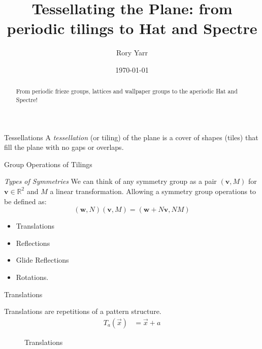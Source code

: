 \documentclass{beamer}
\title[Tilling the Plane]{Tessellating the Plane: from periodic tilings to Hat and Spectre}
\author{Rory Yarr}
\date{\today}
\begin{document}
\begin{frame}
  \titlepage

  \begin{abstract}
    From periodic frieze groups, lattices and wallpaper groups to the aperiodic Hat and Spectre!
  \end{abstract}
\end{frame}

\begin{frame}{Tessellations}
    A \emph{tessellation} (or tiling) of the plane is a cover of shapes (tiles) that fill the plane with no gaps or overlaps.
 
\end{frame}

\begin{frame}{Group Operations of Tilings}
    \begin{center}
      \emph{Types of Symmetries}
      We can think of any symmetry group as a pair $(\mathbf{v},M)$ for $\mathbf{v} \in \mathbb{R}^2$ and $M$ a linear transformation. Allowing a symmetry group operations to be defined as:
      \[(\mathbf{w},N)(\mathbf{v},M)=(\mathbf{w}+N\mathbf{v},NM)\]
      \begin{itemize}
          \item Translations 
          \item Reflections
          \item Glide Reflections
          \item Rotations.
      \end{itemize}
    \end{center}
\end{frame}

\begin{frame}{Translations }
    \begin{center}
     Translations are repetitions of a pattern structure.   \\
     \begin{align*}
         T_a(\vec{x}) &=\vec{x}+a
     \end{align*}\cite{Angela:2023}
    \end{center}
   \begin{figure}
        \centering
        \caption{Translations}
        \label{Reflection}
    \end{figure}
\end{frame}
\end{document}
